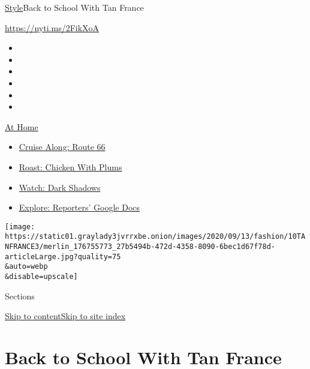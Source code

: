 \href{/section/style}{Style}\textbar{}Back to School With Tan France

\url{https://nyti.ms/2FikXoA}

\begin{itemize}
\item
\item
\item
\item
\item
\item
\end{itemize}

\href{https://www.nytimes3xbfgragh.onion/spotlight/at-home?action=click\&pgtype=Article\&state=default\&region=TOP_BANNER\&context=at_home_menu}{At
Home}

\begin{itemize}
\tightlist
\item
  \href{https://www.nytimes3xbfgragh.onion/2020/09/07/travel/route-66.html?action=click\&pgtype=Article\&state=default\&region=TOP_BANNER\&context=at_home_menu}{Cruise
  Along: Route 66}
\item
  \href{https://www.nytimes3xbfgragh.onion/2020/09/04/dining/sheet-pan-chicken.html?action=click\&pgtype=Article\&state=default\&region=TOP_BANNER\&context=at_home_menu}{Roast:
  Chicken With Plums}
\item
  \href{https://www.nytimes3xbfgragh.onion/2020/09/04/arts/television/dark-shadows-stream.html?action=click\&pgtype=Article\&state=default\&region=TOP_BANNER\&context=at_home_menu}{Watch:
  Dark Shadows}
\item
  \href{https://www.nytimes3xbfgragh.onion/interactive/2020/at-home/even-more-reporters-editors-diaries-lists-recommendations.html?action=click\&pgtype=Article\&state=default\&region=TOP_BANNER\&context=at_home_menu}{Explore:
  Reporters' Google Docs}
\end{itemize}

\texttt{[image: https://static01.graylady3jvrrxbe.onion/images/2020/09/13/fashion/10TANFRANCE3/merlin\_176755773\_27b5494b-472d-4358-8090-6bec1d67f78d-articleLarge.jpg?quality=75\\\&auto=webp\\\&disable=upscale]}

Sections

\protect\hyperlink{site-content}{Skip to
content}\protect\hyperlink{site-index}{Skip to site index}

\hypertarget{back-to-school-with-tan-france}{%
\section{Back to School With Tan
France}\label{back-to-school-with-tan-france}}

